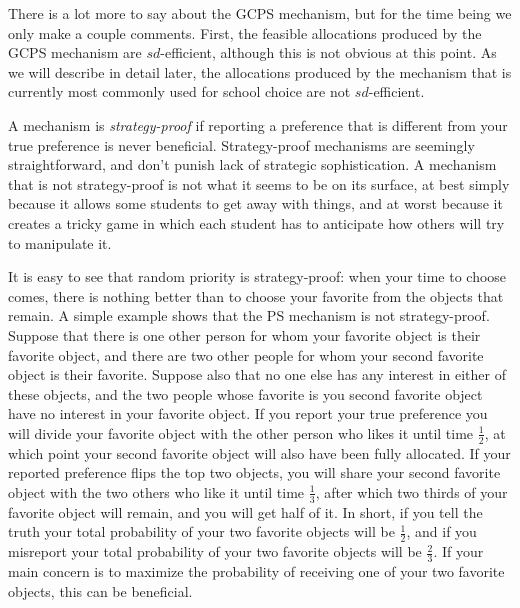 \documentclass[12pt]{article}
\theoremstyle{definition}
\begin{document}
There is a lot more to say about the GCPS mechanism, but for the time
being we only make a couple comments.  First, the feasible allocations
produced by the GCPS mechanism are $sd$-efficient, although this is
not obvious at this point.  As we will describe in detail later, the
allocations produced by the mechanism that is currently most commonly
used for school choice are not $sd$-efficient.

A mechanism is \emph{strategy-proof} if reporting a preference that is
different from your true preference is never beneficial.
Strategy-proof mechanisms are seemingly straightforward, and don't
punish lack of strategic sophistication.  A mechanism that is not
strategy-proof is not what it seems to be on its surface, at best
simply because it allows some students to get away with things, and at
worst because it creates a tricky game in which each student has to
anticipate how others will try to manipulate it.

It is easy to see that random priority is strategy-proof: when your
time to choose comes, there is nothing better than to choose your
favorite from the objects that remain.  A simple example shows that
the PS mechanism is not strategy-proof.  Suppose that there is one
other person for whom your favorite object is their favorite object,
and there are two other people for whom your second favorite object is
their favorite.  Suppose also that no one else has any interest in
either of these objects, and the two people whose favorite is you
second favorite object have no interest in your favorite object.  If
you report your true preference you will divide your favorite object
with the other person who likes it until time $\tfrac12$, at which
point your second favorite object will also have been fully allocated.
If your reported preference flips the top two objects, you will share
your second favorite object with the two others who like it until time
$\tfrac13$, after which two thirds of your favorite object will
remain, and you will get half of it.  In short, if you tell the truth
your total probability of your two favorite objects will be
$\tfrac12$, and if you misreport your total probability of your two
favorite objects will be $\tfrac23$.  If your main concern is to
maximize the probability of receiving one of your two favorite
objects, this can be beneficial.
\end{document}
